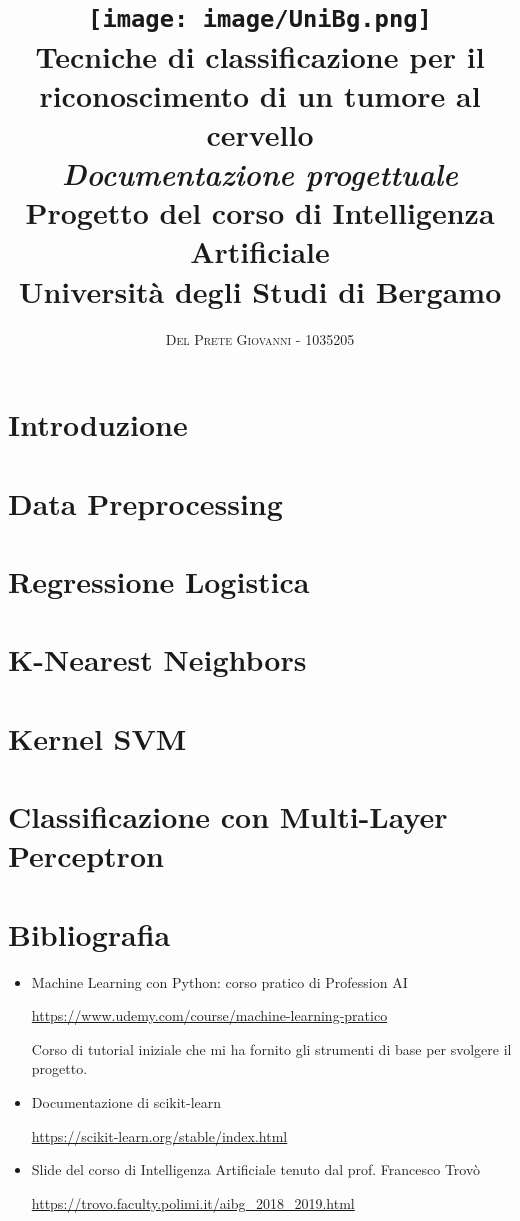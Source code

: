 \documentclass[a4paper,11pt]{book}
\title{
	\texttt{[image: image/UniBg.png]}
	\\ \Huge \textbf{Tecniche di classificazione per il riconoscimento di un tumore al cervello} \\ \huge \textit{\textbf{Documentazione progettuale}} \\ \bigskip \huge Progetto del corso di Intelligenza Artificiale\\ Università degli Studi di Bergamo}
\author{\textsc{Del Prete Giovanni - 1035205}}
\begin{document}
	\maketitle
	\thispagestyle{empty}
	\mainmatter
	\chapter{Introduzione}
	
	\chapter{Data Preprocessing}
	
	\chapter{Regressione Logistica}
	
	\chapter{K-Nearest Neighbors}
	
	\chapter{Kernel SVM}
	
	\chapter{Classificazione con Multi-Layer Perceptron}
	
	\chapter*{Bibliografia}
	\begin{itemize}
		\item Machine Learning con Python: corso pratico di Profession AI 
		
		\href{https://www.udemy.com/course/machine-learning-pratico}{https://www.udemy.com/course/machine-learning-pratico}
		
		Corso di tutorial iniziale che mi ha fornito gli strumenti di base per svolgere il progetto.
		\item Documentazione di scikit-learn
		
		\href{https://scikit-learn.org/stable/index.html}{https://scikit-learn.org/stable/index.html}
		
		\item Slide del corso di Intelligenza Artificiale tenuto dal prof. Francesco Trovò
		
		\href{https://trovo.faculty.polimi.it/aibg_2018_2019.html}{https://trovo.faculty.polimi.it/aibg\_2018\_2019.html}
	\end{itemize}
\end{document}
